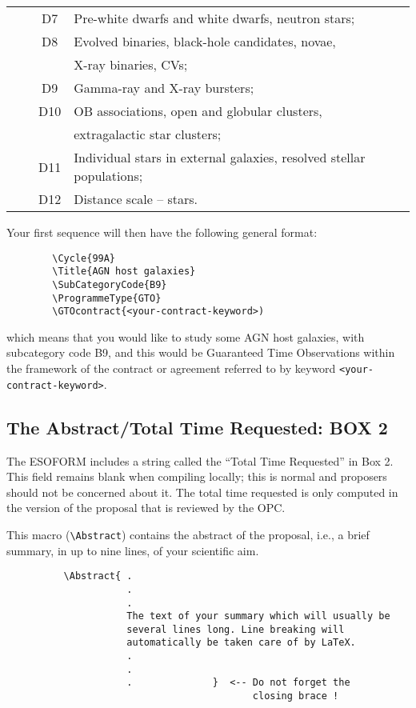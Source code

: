 \documentclass{article}
\begin{document}
\begin{table}[p]
{\begin{center}
\begin{tabular}{llcl}
       &           & D7 & Pre-white dwarfs and white dwarfs, neutron stars; \\ 
       &           & D8 & Evolved binaries, black-hole candidates, novae, \\ 
       &           &    &  X-ray binaries, CVs; \\
       &           & D9 & Gamma-ray and X-ray bursters; \\
       &           & D10& OB associations, open and globular clusters, \\
       &           &    &  extragalactic star clusters; \\
       &           & D11& Individual stars in external galaxies, resolved stellar populations;\\
       &           & D12& Distance scale -- stars.\\[4pt]
\hline
\end{tabular}
\end{center}
}
\end{table}

Your first sequence will then have the following general format:
\begin{verbatim}
        \Cycle{99A}
        \Title{AGN host galaxies}
        \SubCategoryCode{B9}
        \ProgrammeType{GTO}
        \GTOcontract{<your-contract-keyword>)
\end{verbatim}
\noindent which means that you would like to study some AGN host
galaxies, with subcategory code B9, and this would be Guaranteed Time
Observations within the framework of the contract or agreement
referred to by keyword \verb|<your-contract-keyword>|.


\subsection{The Abstract/Total Time Requested:  {\bf BOX 2}}

The ESOFORM includes a string called the
``Total Time Requested'' in Box 2. 
This field remains blank when compiling locally; this 
is normal and proposers should not be concerned about it.
The total time requested is only computed in the version of the proposal 
that is reviewed by the OPC. 

This macro (\verb|\Abstract|) contains the  abstract of the  proposal,
i.e., a brief summary, in up to nine lines, of your scientific aim.
\begin{verbatim}
          \Abstract{ .
                     .
                     .
                     The text of your summary which will usually be 
                     several lines long. Line breaking will  
                     automatically be taken care of by LaTeX.
                     .
                     .
                     .              }  <-- Do not forget the
                                           closing brace !
\end{verbatim}
\end{document}
